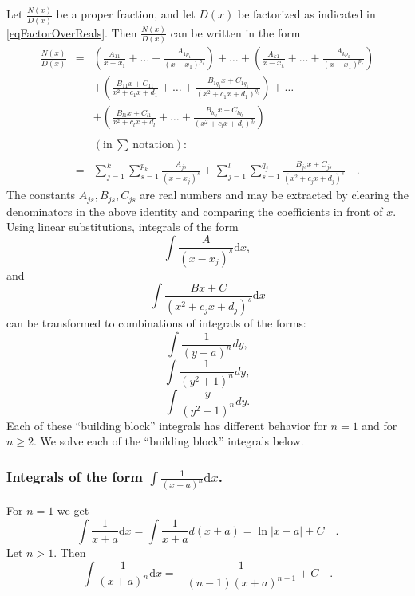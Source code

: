 \documentclass[12pt]{book}
\newcommand{\diff}{\text{d}}
\begin{document}
Let $\frac{N(x)}{D(x)}$ be a proper fraction, and let $D(x)$ be factorized as indicated in \eqref{eqFactorOverReals}. Then $\frac{N(x)}{D(x)}$ can be written in the form
\begin{equation}\label{eqSplitPF}
\begin{array}{rcl}
\displaystyle\frac{N(x)}{D(x)}&=&\displaystyle \left (\frac{A_{11}}{x-x_1}+\dots +\frac{A_{1p_1}}{(x-x_1)^{p_1}}\right) +\dots + \left (\frac{A_{k1}}{x-x_k}+\dots +\frac{A_{kp_k}}{(x-x_1)^{p_k}}\right) \\
&&\displaystyle+\left(\frac {B_{11}x+C_{11}}{x^2+c_1x+d_1}+\dots +\frac {B_{1q_1}x+C_{1q_1}}{(x^2+c_1x+d_1)^{q_1}} \right)+\dots 
\\&&\displaystyle +
\left(\frac {B_{l1}x+C_{l1}}{x^2+c_lx+d_l}+\dots +\frac {B_{lq_l}x+C_{lq_l}}{(x^2+c_lx+d_l)^{q_l}} \right)\\ \\
&&(\mathrm{in~}\sum\mathrm{~notation}):\\ \\
&=&\displaystyle \sum_{j=1}^{k}\sum_{s=1}^{p_k} \frac{A_{js}}{(x-x_j)^s}+\sum_{j=1}^{l}\sum_{s=1}^{q_j} \frac{B_{js}x+C_{js}}{(x^2+c_jx+d_j)^s}\quad .
\end{array}
\end{equation}
The constants $A_{js}, B_{js}, C_{js}$ are real numbers and may be extracted by clearing the denominators in the above identity and comparing the coefficients in front of $x$.
Using linear substitutions, integrals of the form 
\[\displaystyle\int \frac{A}{(x-x_j)^s}\diff x,
\] 
and
\[
\int \frac{Bx+C}{(x^2+c_jx+d_j)^s}\diff x
\] 
can be transformed to combinations of integrals of the forms: 
\[
\int \frac{1}{(y+a)^n}dy,
\]  
\[
\int \frac{1}{(y^2+1)^n}dy,
\] 
\[\int \frac{y}{(y^2+1)^n}dy.
\] 
Each of these ``building block'' integrals has different behavior for $n=1$ and for $n\geq 2$. We solve each of the ``building block'' integrals below. 

\subsubsection{Integrals of the form $\displaystyle\int \frac{1}{(x+a)^n}\diff x$.}
For $n=1$ we get
\begin{equation}\label{eqBuildingBlockInt1base}
\int \frac{1}{x+a}\diff x=\int {\frac{1}{x+a}d(x+a)}= \ln |x+a| +C\quad .
\end{equation}
Let $n> 1$. Then
\begin{equation}\label{eqBuildingBlockInt1N}
\int \frac{1}{(x+a)^n}\diff x= -\frac{1}{(n-1)(x+a)^{n-1}}+C \quad .
\end{equation}
\end{document}

